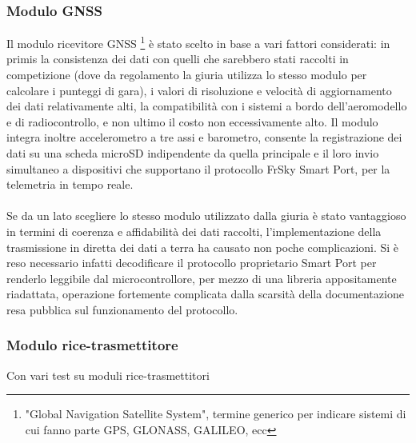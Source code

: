 \documentclass[12pt]{article}
\begin{document}
\subsubsection*{Modulo GNSS}
Il modulo ricevitore GNSS \footnote{"Global Navigation Satellite System", termine generico per indicare sistemi di cui fanno parte GPS, GLONASS, GALILEO, ecc} è stato scelto in base a vari fattori considerati: in primis la consistenza dei dati con quelli che sarebbero stati raccolti in competizione (dove da regolamento la giuria utilizza lo stesso modulo per calcolare i punteggi di gara), i valori di risoluzione e velocità di aggiornamento dei dati relativamente alti, la compatibilità con i sistemi a bordo dell'aeromodello e di radiocontrollo, e non ultimo il costo non eccessivamente alto. Il modulo integra inoltre accelerometro a tre assi e barometro, consente la registrazione dei dati su una scheda microSD indipendente da quella principale e il loro invio simultaneo a dispositivi che supportano il protocollo FrSky Smart Port, per la telemetria in tempo reale.
\\\\
Se da un lato scegliere lo stesso modulo utilizzato dalla giuria è stato vantaggioso in termini di coerenza e affidabilità dei dati raccolti, l'implementazione della trasmissione in diretta dei dati a terra ha causato non poche complicazioni. Si è reso necessario infatti decodificare il protocollo proprietario Smart Port per renderlo leggibile dal microcontrollore, per mezzo di una libreria appositamente riadattata, operazione fortemente complicata dalla scarsità della documentazione resa pubblica sul funzionamento del protocollo.

\subsubsection*{Modulo rice-trasmettitore}
Con vari test su moduli rice-trasmettitori

\newpage


\end{document}
